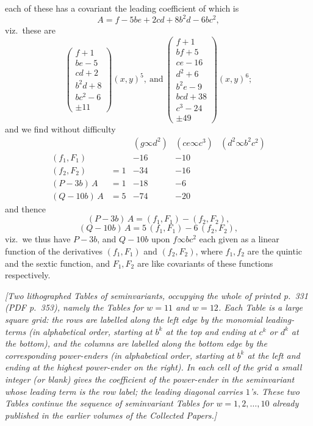 \documentclass[11pt]{article}
\begin{document}
each of these has a covariant the leading coefficient of which is
\[
A = f - 5 b e + 2 c d + 8 b^2 d - 6 b c^2,
\]
viz.\ these are
\[
\left(\!\!\begin{array}{r}f + 1 \\ b e - 5 \\ c d + 2 \\ b^2 d + 8 \\ b c^2 - 6 \\[2pt]\hline \pm 11\end{array}\!\!\right)\!\!(x, y)^5,\ \text{and}\ \left(\!\!\begin{array}{r}f + 1 \\ b f + 5 \\ c e - 16 \\ d^2 + 6 \\ b^2 e - 9 \\ b c d + 38 \\ c^3 - 24 \\[2pt]\hline \pm 49\end{array}\!\!\right)\!\!(x, y)^6;
\]
and we find without difficulty
\[
\begin{array}{lcccc}
                 & & (g \infty d^2) & (ce \infty c^3) & (d^2 \infty b^2 c^2) \\[2pt]
(f_1, F_1)       &  & -16  & -10 & \\
(f_2, F_2)       &= 1 & -34 & -16 & \\
(P - 3b)\,A      &= 1 & -18 & -6  & \\
(Q - 10 b)\,A    &= 5 & -74 & -20 &
\end{array}
\]
and thence
\[
(P - 3b)\,A = (f_1, F_1) - (f_2, F_2),
\]
\[
(Q - 10 b)\,A = 5\,(f_1, F_1) - 6\,(f_2, F_2),
\]
viz.\ we thus have $P - 3b$, and $Q - 10b$ upon $f \infty b c^2$ each given as a linear function of the derivatives $(f_1, F_1)$ and $(f_2, F_2)$, where $f_1, f_2$ are the quintic and the sextic function, and $F_1, F_2$ are like covariants of these functions respectively.

\textit{[Two lithographed Tables of seminvariants, occupying the whole of printed p.\ 331 (PDF p.\ 353), namely the Tables for $w = 11$ and $w = 12$. Each Table is a large square grid: the rows are labelled along the left edge by the monomial leading-terms (in alphabetical order, starting at $b^k$ at the top and ending at $c^k$ or $d^k$ at the bottom), and the columns are labelled along the bottom edge by the corresponding power-enders (in alphabetical order, starting at $b^k$ at the left and ending at the highest power-ender on the right). In each cell of the grid a small integer (or blank) gives the coefficient of the power-ender in the seminvariant whose leading term is the row label; the leading diagonal carries $1$'s. These two Tables continue the sequence of seminvariant Tables for $w = 1, 2, \ldots, 10$ already published in the earlier volumes of the Collected Papers.]}
\end{document}
